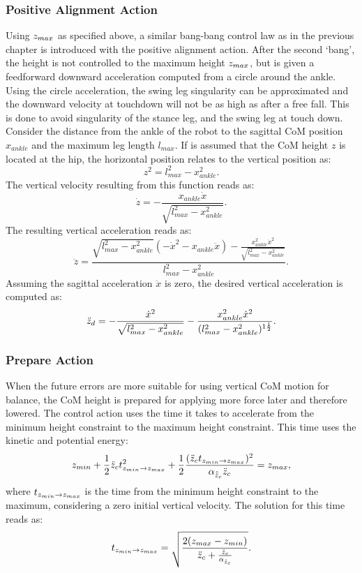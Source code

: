 \subsubsection{Positive Alignment Action} 
Using $z_{max}$ as specified above, a similar bang-bang control law as in the previous chapter is introduced with the positive alignment action. After the second `bang', the height is not controlled to the maximum height $z_{max}$, but is given a feedforward downward acceleration computed from a circle around the ankle. Using the circle acceleration, the swing leg singularity can be approximated and the downward velocity at touchdown will not be as high as after a free fall. This is done to avoid singularity of the stance leg, and the swing leg at touch down. Consider the distance from the ankle of the robot to the sagittal \ac{CoM} position $x_{ankle}$ and the maximum leg length $l_{max}$. If is assumed that the \ac{CoM} height $z$ is located at the hip, the horizontal position relates to the vertical position as:
\begin{equation}
z^2 = l_{max}^2-x_{ankle}^2.
\end{equation}
The vertical velocity resulting from this function reads as:
\begin{equation}
 \dot{z} = -\frac{x_{ankle}\dot{x}}{\sqrt{l_{max}^2-x_{ankle}^2}}.
\end{equation}
The resulting vertical acceleration reads as:
\begin{equation}
\ddot{z} = \frac{\sqrt{l_{max}^2-x_{ankle}^2}(-\dot{x}^2-x_{ankle}\ddot{x}) - \frac{x_{ankle}^2\dot{x}^2}{\sqrt{l_{max}^2-x_{ankle}^2}}}{ l_{max}^2-x_{ankle}^2}.
\end{equation}
Assuming the sagittal acceleration $\ddot{x}$ is zero, the desired vertical acceleration is computed as:
\begin{equation}
 \ddot{z}_d = -\frac{\dot{x}^2}{\sqrt{ l_{max}^2-x_{ankle}^2}} - \frac{x_{ankle}^2\dot{x}^2}{(l_{max}^2-x_{ankle}^2)^{1\frac{1}{2}}}.
\end{equation}
\subsubsection{Prepare Action} 
When the future errors are more suitable for using vertical \ac{CoM} motion for balance, the \ac{CoM} height is prepared for applying more force later and therefore lowered. The control action uses the time it takes to accelerate from the minimum height constraint to the maximum height constraint. This time uses the kinetic and potential energy:
\begin{equation}
	z_{min} + \frac{1}{2}\ddot{z}_{c} t_{z_{min} \rightarrow z_{max}}^2 + \frac{1}{2}\frac{(\ddot{z}_{c} t_{z_{min} \rightarrow z_{max}})^2}{\alpha_{\hat{\ddot{z}}_{c}} \ddot{z}_{c}} = z_{max},
\end{equation}
where $t_{z_{min} \rightarrow z_{max}}$ is the time from the minimum height constraint to the maximum, considering a zero initial vertical velocity.
The solution for this time reads as:
\begin{equation}
 t_{z_{min} \rightarrow z_{max}}= \sqrt{\frac{2(z_{max} - z_{min})}{\ddot{z}_{c} + \frac{\ddot{z}_{c}}{\alpha_{\hat{\ddot{z}}_{c}}} }}.
\end{equation}

